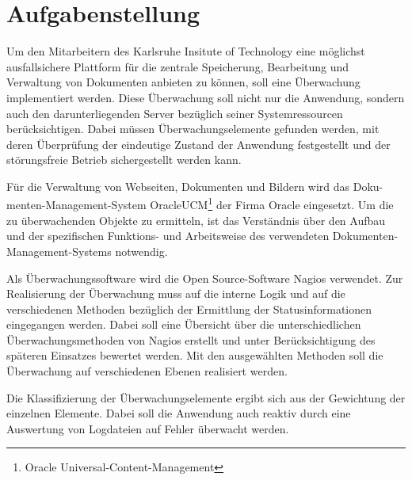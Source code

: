\section{Aufgabenstellung}

Um den Mitarbeitern des Karlsruhe Insitute of Technology eine möglichst ausfallsichere Plattform für die zentrale Speicherung, Bearbeitung und Verwaltung von Dokumenten anbieten zu können, soll eine Überwachung implementiert werden.
Diese Überwachung soll nicht nur die Anwendung, sondern auch den darunterliegenden Server bezüglich seiner Systemressourcen berücksichtigen.
Dabei müssen Überwachungselemente gefunden werden, mit deren Überprüfung der eindeutige Zustand der Anwendung festgestellt und der störungsfreie Betrieb sichergestellt werden kann.

Für die Verwaltung von Webseiten, Dokumenten und Bildern wird das Doku-menten-Management-System \gls{OracleUCM}\footnote{Oracle Universal-Content-Management} der Firma Oracle eingesetzt.
Um die zu überwachenden Objekte zu ermitteln, ist das Verständnis über den Aufbau und der spezifischen Funktions- und Arbeitsweise des verwendeten Dokumenten-Management-Systems notwendig.

Als Überwachungssoftware wird die Open Source-Software Nagios verwendet.
Zur Realisierung der Überwachung muss auf die interne Logik und auf die verschiedenen Methoden bezüglich der Ermittlung der Statusinformationen eingegangen werden.
Dabei soll eine Übersicht über die unterschiedlichen Überwachungsmethoden von Nagios erstellt und unter Berücksichtigung des späteren Einsatzes bewertet werden.
Mit den ausgewählten Methoden soll die Überwachung auf verschiedenen Ebenen realisiert werden.

Die Klassifizierung der Überwachungselemente ergibt sich aus der Gewichtung der einzelnen Elemente.
Dabei soll die Anwendung auch reaktiv durch eine Auswertung von Logdateien auf Fehler überwacht werden.


